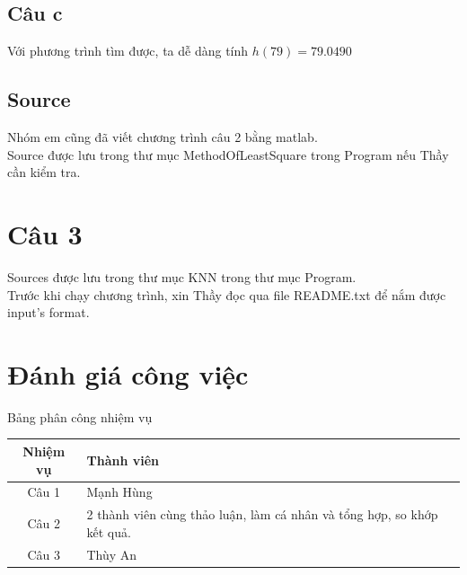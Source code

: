 \documentclass[a4paper 14pt]{extarticle}
\begin{document}
		\subsection{Câu c}
			Với phương trình tìm được, ta dễ dàng tính $h(79) = 79.0490$ 
		\subsection{Source}
			Nhóm em cũng đã viết chương trình câu 2 bằng matlab.\\
			Source được lưu trong thư mục MethodOfLeastSquare trong Program nếu Thầy cần kiểm tra.
	\section{Câu 3}
		Sources được lưu trong thư mục KNN trong thư mục Program.\\
		Trước khi chạy chương trình, xin Thầy đọc qua file README.txt để nắm được input's format.
	\section{Đánh giá công việc}
	Bảng phân công nhiệm vụ\\
	\begin{tabular}{c | p{4in}}
		Nhiệm vụ & Thành viên \\
		\hline
		Câu 1&Mạnh Hùng\\
		Câu 2&2 thành viên cùng thảo luận, làm cá nhân và tổng hợp, so khớp kết quả.\\
		Câu 3&Thùy An
	\end{tabular}
\end{document}
